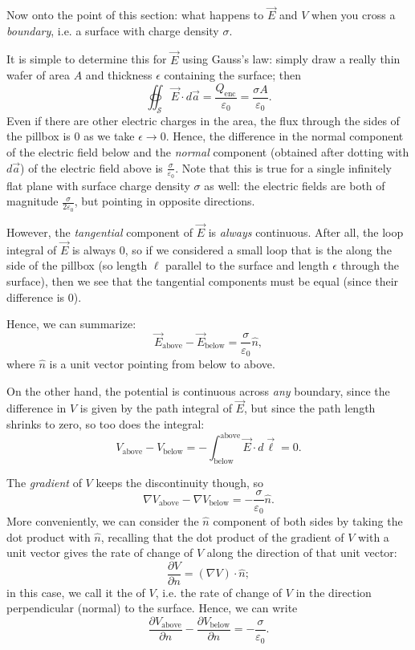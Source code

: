 Now onto the point of this section: what happens to $\vec{E}$ and $V$ when you cross a \textit{boundary}, i.e. a surface with charge density $\sigma$. 

It is simple to determine this for $\vec{E}$ using Gauss's law: simply draw a really thin wafer of area $A$ and thickness $\epsilon$ containing the surface; then
\[\oiint_{\mathcal{S}}\vec{E}\cdot d\vec{a}=\frac{Q_{\text{enc}}}{\varepsilon_0}=\frac{\sigma A}{\varepsilon_0}.\]
Even if there are other electric charges in the area, the flux through the sides of the pillbox is 0 as we take $\epsilon\to 0$. Hence, the difference in the normal component of the electric field below and the \textit{normal} component (obtained after dotting with $d\vec{a}$) of the electric field above is $\frac{\sigma}{\varepsilon_0}$. Note that this is true for a single infinitely flat plane with surface charge density $\sigma$ as well: the electric fields are both of magnitude $\frac{\sigma}{2\varepsilon_0}$, but pointing in opposite directions.

However, the \textit{tangential} component of $\vec{E}$ is \textit{always} continuous. After all, the loop integral of $\vec{E}$ is always $0$, so if we considered a small loop that is the along the side of the pillbox (so length $\ell$ parallel to the surface and length $\epsilon$ through the surface), then we see that the tangential components must be equal (since their difference is 0).

Hence, we can summarize:
\[\boxed{\vec{E}_{\text{above}}-\vec{E}_{\text{below}}=\frac{\sigma}{\varepsilon_0}\hat{n}},\]
where $\hat{n}$ is a unit vector pointing from below to above.

On the other hand, the potential is continuous across \textit{any} boundary, since the difference in $V$ is given by the path integral of $\vec{E}$, but since the path length shrinks to zero, so too does the integral:
\[V_{\text{above}}-V_{\text{below}}=-\int_{\text{below}}^{\text{above}}\vec{E}\cdot d\vec{\ell}=0.\]

The \textit{gradient} of $V$ keeps the discontinuity though, so
\[\nabla V_{\text{above}}-\nabla V_{\text{below}}=-\frac{\sigma}{\varepsilon_0}\hat{n}.\]
More conveniently, we can consider the $\hat{n}$ component of both sides by taking the dot product with $\hat{n}$, recalling that the dot product of the gradient of $V$ with a unit vector gives the rate of change of $V$ along the direction of that unit vector:
\[\frac{\partial V}{\partial n}=(\nabla V)\cdot\hat{n};\]
in this case, we call it the  of $V$, i.e. the rate of change of $V$ in the direction perpendicular (normal) to the surface. Hence, we can write
\[\boxed{\frac{\partial V_{\text{above}}}{\partial n}-\frac{\partial V_{\text{below}}}{\partial n}=-\frac{\sigma}{\varepsilon_0}}.\]

